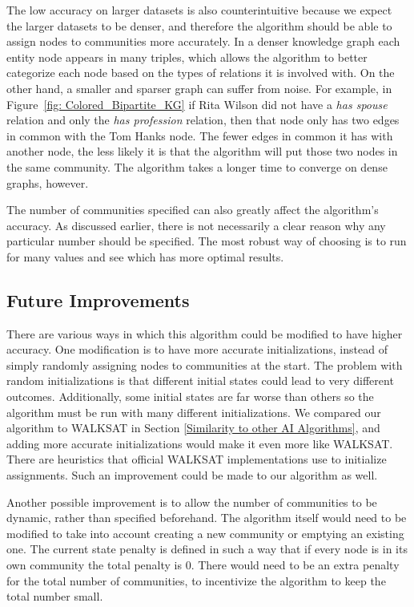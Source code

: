 \documentclass[12pt]{article}
\begin{document}
The low accuracy on larger datasets is also counterintuitive because we expect
the larger datasets to be denser, and therefore the algorithm should be able to
assign nodes to communities more accurately. In a denser knowledge graph each
entity node appears in many triples, which allows the algorithm to better
categorize each node based on the types of relations it is involved with. On the
other hand, a smaller and sparser graph can suffer from noise. For example, in
Figure~\ref{fig: Colored_Bipartite_KG} if Rita Wilson did not have a \textit{has
spouse} relation and only the \textit{has profession} relation, then that node
only has two edges in common with the Tom Hanks node. The fewer edges in common
it has with another node, the less likely it is that the algorithm will put
those two nodes in the same community. The algorithm takes a longer time to
converge on dense graphs, however.

The number of communities specified can also greatly affect the algorithm's
accuracy. As discussed earlier, there is not necessarily a clear reason why
any particular number should be specified. The most robust way of choosing is
to run for many values and see which has more optimal results.

\subsection{Future Improvements}
\label{Future Improvements}

There are various ways in which this algorithm could be modified to have higher
accuracy. One modification is to have more accurate initializations, instead of
simply randomly assigning nodes to communities at the start. The problem with
random initializations is that different initial states could lead to very
different outcomes. Additionally, some initial states are far worse than others
so the algorithm must be run with many different initializations. We compared
our algorithm to WALKSAT in Section \ref{Similarity to other AI Algorithms}, and
adding more accurate initializations would make it even more like WALKSAT. There
are heuristics that official WALKSAT implementations use to initialize
assignments. Such an improvement could be made to our algorithm as well.

Another possible improvement is to allow the number of communities to be dynamic,
rather than specified beforehand. The algorithm itself would need to be modified
to take into account creating a new community or emptying an existing one. The
current state penalty is defined in such a way that if every node is in its own
community the total penalty is 0. There would need to be an extra penalty for
the total number of communities, to incentivize the algorithm to keep the
total number small.
\end{document}
